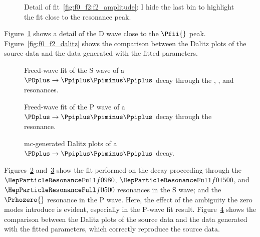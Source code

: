     \begin{figure}
        \centering
        
        \caption{Detail of fit~\ref{fig:f0_f2:f2_amplitude}: I hide the last bin to highlight the fit close to the resonance peak.~\Square}
        \label{fig:f0_f2:f2_amplitude_zoom}
    \end{figure}
    Figure~\ref{fig:f0_f2:f2_amplitude_zoom} shows a detail of the D wave close to the $\Pfii{}$ peak.
    Figure~\ref{fig:f0_f2_dalitz} shows the comparison between the Dalitz plots of the source data and the data generated with the fitted parameters.


    \begin{figure}
        \centering
        \subfloat[][]{}

        \subfloat[][]{}

        \caption{Freed-wave fit of the S wave of a $\PDplus \to \Ppiplus\Ppiminus\Ppiplus$ decay through the \Pfnez{}, \Pfofzz{}, and \Psigma{} resonances.~\Star}
        \label{fig:f0_f0_1500_sigma_rho0:s_wave}
    \end{figure}
    \begin{figure}
        \centering
        \subfloat[][]{}

        \subfloat[][]{}

        \caption{Freed-wave fit of the P wave of a $\PDplus \to \Ppiplus\Ppiminus\Ppiplus$ decay through the \Prhozero{} resonance.~\Star}
        \label{fig:f0_f0_1500_sigma_rho0:p_wave}
    \end{figure}
    \begin{figure}
        \centering

        \caption{\ac{mc}-generated Dalitz plots of a $\PDplus \to \Ppiplus\Ppiminus\Ppiplus$ decay.~\Star}
        \label{fig:f0_f0_1500_sigma_rho0_dalitz}
    \end{figure}
    Figures~\ref{fig:f0_f0_1500_sigma_rho0:s_wave} and~\ref{fig:f0_f0_1500_sigma_rho0:p_wave} show the fit performed on the decay proceeding through the $\Pfnez{}$, $\Pfofzz{}$, and $\Psigma{}$ resonances in the S wave; and the $\Prhozero{}$ resonance in the P wave.
    Here, the effect of the ambiguity the zero modes introduce is evident, especially in the P-wave fit result.
    Figure~\ref{fig:f0_f0_1500_sigma_rho0_dalitz} shows the comparison between the Dalitz plots of the source data and the data generated with the fitted parameters, which correctly reproduce the source data.

